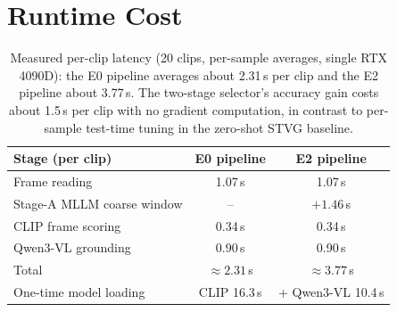 \documentclass[10pt]{article}
\begin{document}
\section{Runtime Cost}\label{app:cost}

\begin{table}[htbp]
\centering
\small
\begin{tabular}{lcc}
\toprule
Stage (per clip) & E0 pipeline & E2 pipeline \\
\midrule
Frame reading & 1.07\,s & 1.07\,s \\
Stage-A MLLM coarse window & -- & $+1.46$\,s \\
CLIP frame scoring & 0.34\,s & 0.34\,s \\
Qwen3-VL grounding & 0.90\,s & 0.90\,s \\
Total & $\approx 2.31$\,s & $\approx 3.77$\,s \\
\midrule
One-time model loading & CLIP 16.3\,s & + Qwen3-VL 10.4\,s \\
\bottomrule
\end{tabular}
\caption{Measured per-clip latency (20 clips, per-sample averages, single RTX 4090D): the E0 pipeline averages about 2.31\,s per clip and the E2 pipeline about 3.77\,s. The two-stage selector's accuracy gain costs about 1.5\,s per clip with no gradient computation, in contrast to per-sample test-time tuning in the zero-shot STVG baseline.}
\label{tab:cost}
\end{table}
\end{document}

